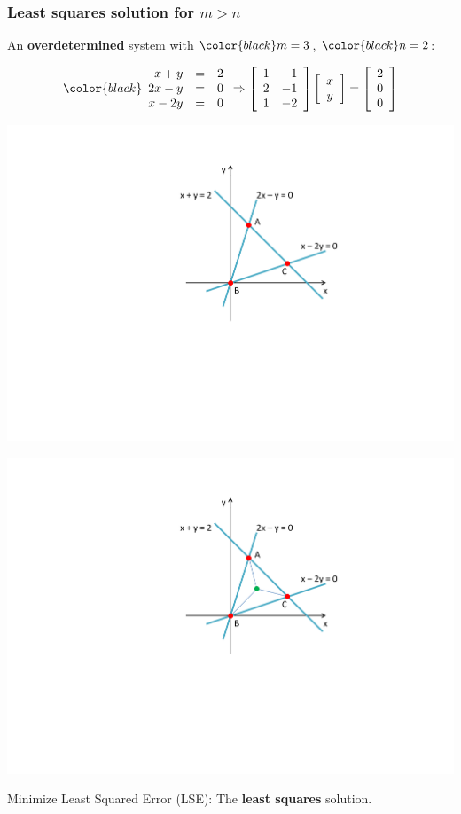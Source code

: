 \documentclass[compress]{beamer}
\newcommand{\black}[1]{{\color{black}#1}}
\renewcommand{\emph}[1]{\textbf{\black{#1}}}
\newcommand{\beq}[1]{\[\black{#1}\]}
\begin{document}

\begin{frame}[fragile]
\frametitle{Least squares solution for $m>n$}

An \emph{overdetermined} system with $\black{m=3}$, $\black{n=2}$:


\beq{
\begin{array}{rrr}
x + y   &=& 2 \\
2x - y  &=& 0\\
x - 2y  &=& 0
\end{array}
\Rightarrow \left[\begin{array}{rr}
1 & 1 \\
2 & -1 \\
1 & -2
\end{array}
\right]
\left[ 
\begin{array}{c}
x\\
y
\end{array}
\right] =  
\left[
\begin{array}{c}
2\\
0\\
0
\end{array}
\right]
}

\begin{overprint}
\begin{center}
\includegraphics[trim = 80mm 90mm 60mm 20mm, clip, width=.6\textwidth]{./img/overdetermined-1}
\end{center}

\begin{center}
\includegraphics[trim = 80mm 90mm 60mm 20mm, clip, width=.6\textwidth]{./img/overdetermined-2}
\end{center}

Minimize Least Squared Error (LSE): The \emph{least squares} solution.

\end{overprint}

\end{frame}
\end{document}
